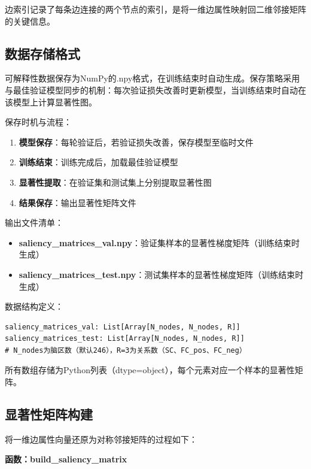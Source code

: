 边索引记录了每条边连接的两个节点的索引，是将一维边属性映射回二维邻接矩阵的关键信息。

\subsection{数据存储格式}

可解释性数据保存为NumPy的.npy格式，在训练结束时自动生成。保存策略采用与最佳验证模型同步的机制：每次验证损失改善时更新模型，当训练结束时自动在该模型上计算显著性图。

保存时机与流程：

\begin{enumerate}
    \item \textbf{模型保存}：每轮验证后，若验证损失改善，保存模型至临时文件
    \item \textbf{训练结束}：训练完成后，加载最佳验证模型
    \item \textbf{显著性提取}：在验证集和测试集上分别提取显著性图
    \item \textbf{结果保存}：输出显著性矩阵文件
\end{enumerate}

输出文件清单：

\begin{itemize}
    \item \textbf{saliency\_matrices\_val.npy}：验证集样本的显著性梯度矩阵（训练结束时生成）
    \item \textbf{saliency\_matrices\_test.npy}：测试集样本的显著性梯度矩阵（训练结束时生成）
\end{itemize}

数据结构定义：

\begin{verbatim}
saliency_matrices_val: List[Array[N_nodes, N_nodes, R]]
saliency_matrices_test: List[Array[N_nodes, N_nodes, R]]
# N_nodes为脑区数（默认246），R=3为关系数（SC、FC_pos、FC_neg）
\end{verbatim}

所有数组存储为Python列表（dtype=object），每个元素对应一个样本的显著性矩阵。

\subsection{显著性矩阵构建}

将一维边属性向量还原为对称邻接矩阵的过程如下：

\textbf{函数：build\_saliency\_matrix}


